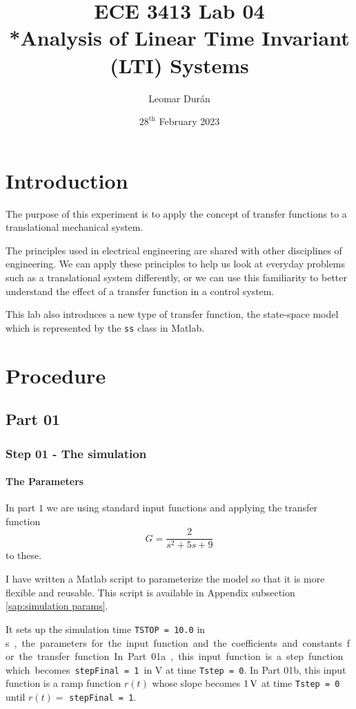 \documentclass[12pt]{article}
\title{ECE 3413 Lab 04\\*Analysis of Linear Time Invariant (LTI) Systems}
\author{Leomar Dur\'an}
\date{${28}^{\text{th}}$ February 2023}
\begin{document}
\maketitle
\newpage

\section{Introduction}

The purpose of this experiment is to apply the concept of transfer functions to a translational mechanical system.

The principles used in electrical engineering are shared with other disciplines of engineering.
We can apply these principles to help us look at everyday problems such as a translational system differently,
or we can use this familiarity to better understand the effect of a transfer function in a control system.

This lab also introduces a new type of transfer function, the state-space model which is represented by the \texttt{ss} class in Matlab.

\section{Procedure}

\subsection{Part 01}

\subsubsection{Step 01 - The simulation}

\paragraph{The Parameters}

In part $1$ we are using standard input functions and applying the transfer function
$$
    G = \frac2{s^2 + 5 s + 9}
$$
to these.

I have written a Matlab script to parameterize the model so that it is more flexible and reusable.
This script is available in Appendix subsection \ref{sap:simulation params}.

It sets up the simulation time \texttt{TSTOP = 10.0} in \si\second, the parameters for the input function and the coefficients and constants for the transfer function.
In Part 01a, this input function is a step function which becomes \texttt{stepFinal = 1} in $\si\volt$ at time \texttt{Tstep = 0}.
In Part 01b, this input function is a ramp function $r(t)$ whose slope becomes $\SI1\volt$ at time \texttt{Tstep = 0} until $r(t) =$ \texttt{stepFinal = 1}.
\end{document}
